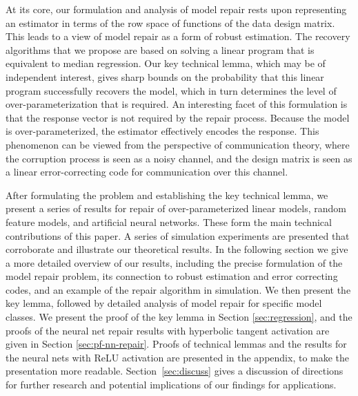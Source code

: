 At its core, our formulation and analysis of model repair rests upon representing an estimator in terms of the row space of functions of the data design matrix. This leads to a view of model repair as a form of robust estimation. The recovery algorithms that we propose are based on solving a linear program that is equivalent to median regression. Our key technical lemma, which may be of independent interest, gives sharp bounds on the probability that this linear program successfully recovers the model, which in turn determines the level of over-parameterization that is required. An interesting facet of this formulation is that the response vector is not required by the repair process. Because the model is over-parameterized, the estimator effectively encodes the response. This phenomenon can be viewed from the perspective of communication theory, where the corruption process is seen as a noisy channel, and the design matrix is seen as a linear error-correcting code for communication over this channel.

After formulating the problem  and establishing the key technical lemma, we present a series of results for
repair of over-parameterized linear models, random feature models, and artificial neural networks. These form the main technical contributions of this paper.
A series of simulation experiments are presented that corroborate and illustrate our theoretical results.
In the following section we give a more detailed overview of our results, including the precise formulation of the model repair problem, its connection to robust estimation and error correcting codes, and an example of the repair algorithm in simulation. We then present the key lemma, followed by detailed analysis of model repair for specific model classes.
We present the proof of the key lemma in Section \ref{sec:regression}, and the proofs of the neural net repair results with hyperbolic tangent activation are given in Section \ref{sec:pf-nn-repair}. Proofs of technical lemmas and the results for the neural nets with ReLU activation are presented in the appendix, to make the presentation more readable.
Section~\ref{sec:discuss} gives a discussion of directions for further research and potential implications of our findings for applications.
